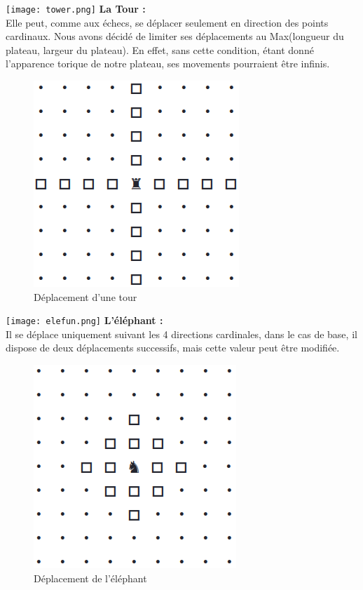         \texttt{[image: tower.png]} \textbf{La Tour :}\label{part:tower} \\
        Elle peut, comme aux échecs, se déplacer seulement en direction des points cardinaux. Nous avons décidé de limiter ses déplacements au Max(longueur du plateau, largeur du plateau). En effet, sans cette condition, étant donné l'apparence torique de notre plateau, ses movements pourraient être infinis.
        \medbreak
             \begin{figure}[H]
                \centering
                \includegraphics[scale=0.3]{img/dep_tower.png}
                \caption{Déplacement d'une tour}
                \label{fig:dep_tower}
            \end{figure}
        \texttt{[image: elefun.png]} \textbf{L'éléphant :} \\
        Il se déplace uniquement suivant les 4 directions cardinales, dans le cas de base, il dispose de deux déplacements successifs, mais cette valeur peut être modifiée.
        \medbreak
            \begin{figure}[H]
                \centering
                \includegraphics[scale=0.3]{img/dep_elefun.png}
                \caption{Déplacement de l'éléphant}
                \label{fig:dep_éléfun}
            \end{figure}
            
